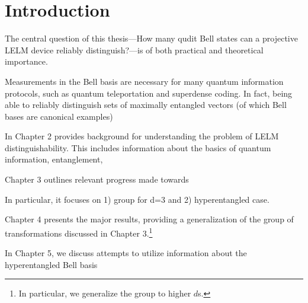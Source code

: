 \chapter{Introduction}

The central question of this thesis---How many qudit Bell states can a projective LELM device reliably distinguish?---is of both practical and theoretical importance. 





Measurements in the Bell basis are necessary for many quantum information protocols, such as quantum teleportation and superdense coding. In fact, being able to reliably distinguish sets of maximally entangled vectors (of which Bell bases are canonical examples)

\cite{coding}







In Chapter 2 provides background for understanding the problem of LELM distinguishability. This includes information about the basics of quantum information, entanglement, 

Chapter 3 outlines relevant progress made towards 

In particular, it focuses on 1) group for d=3 and 2) hyperentangled case.


Chapter 4 presents the major results, providing a generalization of the group of transformations discussed in Chapter 3.\footnote{In particular, we generalize the group to higher $d$s.}


In Chapter 5, we discuss attempts to utilize information about the hyperentangled Bell basis 

